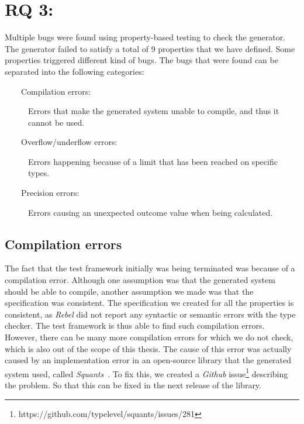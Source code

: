 \section{RQ 3: \rqThree{}}
Multiple bugs were found using property-based testing to check the generator.
The generator failed to satisfy a total of 9 properties that we have defined.
Some properties triggered different kind of bugs. The bugs that were found can
be separated into the following categories:
\begin{description}
  \item[~~~~Compilation errors:] Errors that make the generated system unable to compile, and thus it cannot be used.
  \item[~~~~Overflow/underflow errors:] Errors happening because of a limit that has been reached on specific types.
  \item[~~~~Precision errors:] Errors causing an unexpected outcome value when being calculated.
\end{description}
\subsection*{Compilation errors}
The fact that the test framework initially was being terminated was because of a
compilation error. Although one assumption was that the generated system should
be able to compile, another assumption we made was that the specification was
consistent. The specification we created for all the properties is consistent,
as \textit{Rebel} did not report any syntactic or semantic errors with the type
checker. The test framework is thus able to find such compilation errors. However,
there can be many more compilation errors for which we do not check, which is
also out of the scope of this thesis. The cause of this error was actually
caused by an implementation error in an open-source library that the generated
system used, called \textit{Squants}~\cite{siteSquants2017}. To fix this, we
created a \textit{Github}
issue\footnote{https://github.com/typelevel/squants/issues/281} describing the
problem. So that this can be fixed in the next release of the library.

